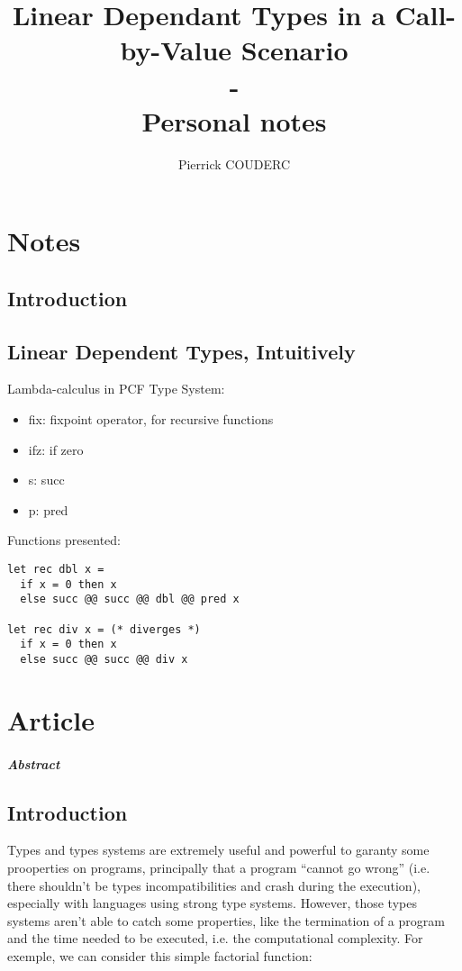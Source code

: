 \documentclass[a4paper,12pt]{report}
\title{Linear Dependant Types in a Call-by-Value Scenario \\
- \\
Personal notes}
\author{Pierrick COUDERC}
\begin{document}
\maketitle

\chapter{Notes}

\section{Introduction}

\section{Linear Dependent Types, Intuitively}

Lambda-calculus in PCF Type System: 
\begin{itemize}
\item fix: fixpoint operator, for recursive functions
\item ifz: if zero
\item s: succ
\item p: pred
\end{itemize}

Functions presented:
\begin{verbatim}
let rec dbl x =
  if x = 0 then x
  else succ @@ succ @@ dbl @@ pred x

let rec div x = (* diverges *)
  if x = 0 then x
  else succ @@ succ @@ div x
\end{verbatim}


\chapter{Article}

\paragraph{Abstract}

\section{Introduction}

Types and types systems are extremely useful and powerful to garanty some
prooperties on programs, principally that a program ``cannot go wrong''
(i.e. there shouldn't be types incompatibilities and crash during the
execution), especially with languages using strong type systems. However, those
types systems aren't able to catch some properties, like the termination of a
program and the time needed to be executed, i.e. the computational
complexity. For exemple, we can consider this simple factorial function:
\end{document}
